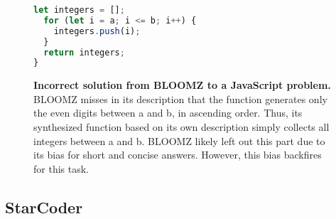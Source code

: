 \begin{figure}[htbp]
\begin{lstlisting}[language=JavaScript,breaklines=true,basicstyle=\ttfamily\scriptsize]
  let integers = [];
  for (let i = a; i <= b; i++) {
    integers.push(i);
  }
  return integers;
}
\end{lstlisting}

\hrulefill
\caption{\textbf{Incorrect solution from BLOOMZ to a \evale{} JavaScript problem.} BLOOMZ misses in its description that the function generates only the even digits between a and b, in ascending order. Thus, its synthesized function based on its own description simply collects all integers between a and b. BLOOMZ likely left out this part due to its bias for short and concise answers. However, this bias backfires for this task.}
\label{fig:bloomzjs}
\end{figure}

\FloatBarrier


\subsection{StarCoder}
\label{sec:examplestarcoder}

